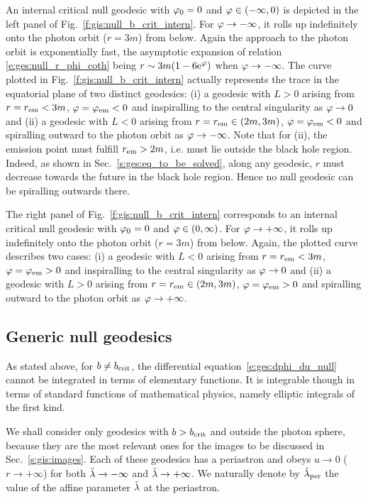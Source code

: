 An internal critical null geodesic with $\varphi_0=0$ and $\varphi\in(-\infty,0)$
is depicted in the left panel of Fig.~\ref{f:gis:null_b_crit_intern}.
For $\varphi\to -\infty$, it rolls up indefinitely onto the photon
orbit ($r=3m$) from below. Again the approach to the photon orbit is exponentially
fast, the asymptotic expansion of relation \eqref{e:ges:null_r_phi_coth} being
$r\sim 3m (1 - 6 \mathrm{e}^\varphi)$ when $\varphi\to -\infty$.
The curve plotted in Fig.~\ref{f:gis:null_b_crit_intern} actually represents the trace in the equatorial plane of two
distinct geodesics: (i) a geodesic with $L>0$ arising
from $r=r_{\rm em} < 3 m$, $\varphi=\varphi_{\rm em}<0$ and inspiralling to the
central singularity as $\varphi\to 0$ and (ii) a geodesic with $L<0$ arising from
$r = r_{\rm em} \in (2m,  3 m)$, $\varphi=\varphi_{\rm em}<0$ and spiralling outward
to the photon orbit as $\varphi\to -\infty$. Note that for (ii), the
emission point must fulfill $r_{\rm em} > 2m$, i.e. must lie outside the black
hole region. Indeed, as shown in Sec.~\ref{s:ges:eq_to_be_solved}, along
any geodesic, $r$ must decrease towards the future in the black hole region.
Hence no null geodesic can be spiralling outwards there.

The right panel of Fig.~\ref{f:gis:null_b_crit_intern} corresponds to an
internal critical null geodesic with $\varphi_0=0$ and $\varphi\in(0, \infty)$.
For $\varphi\to +\infty$, it rolls up indefinitely onto the photon
orbit ($r=3m$) from below. Again, the plotted curve describes two cases:
(i) a geodesic with $L<0$ arising
from $r=r_{\rm em} < 3 m$, $\varphi=\varphi_{\rm em}>0$ and inspiralling to the
central singularity as $\varphi\to 0$ and (ii) a geodesic with $L>0$ arising from
$r = r_{\rm em} \in (2m,  3 m)$, $\varphi=\varphi_{\rm em}>0$ and spiralling outward
to the photon orbit as $\varphi\to +\infty$.


\subsection{Generic null geodesics} \label{s:gis:gener_geod}

As stated above, for $b \not= b_{\rm crit}$, the differential equation~\eqref{e:ges:dphi_du_null} cannot be integrated
in terms of elementary functions. It is integrable though in terms of standard
functions of mathematical physics, namely elliptic integrals of the first kind.

We shall consider only geodesics with $b>b_{\rm crit}$ and outside
the photon sphere, because they are the most
relevant ones for the images to be discussed in Sec.~\ref{s:gis:images}.
Each of these geodesics has a periastron and obeys $u\to 0$
($r\to +\infty$) for both ${\tilde\lambda}\to -\infty$ and
${\tilde\lambda}\to +\infty$. We naturally denote by ${\tilde\lambda}_{\rm per}$ the value of the
affine parameter ${\tilde\lambda}$ at the periastron.

